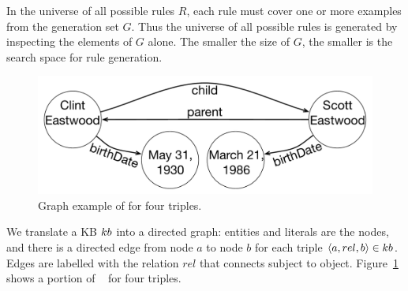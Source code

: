 In the universe of all possible rules $R$, 
each rule must cover one or more examples from the generation set $G$. 
Thus the universe of all possible rules is generated by inspecting the elements of $G$ alone. 
The smaller the size of $G$, the smaller is the search space for rule generation. 


\begin{figure}[t]
	\centering
	\includegraphics[width=0.8\columnwidth]{include/figure/graph_example.pdf}
	\vspace{-1ex}
	\caption{Graph example of \dbpedia for four triples.}
	\label{fig:krd_graph_example}
	\vspace{-3ex}
\end{figure}

We translate a KB ${\sc kb}$ into a directed graph: entities and literals are the nodes, and there is a directed edge from node $a$ to node $b$ for each triple $\langle a,rel,b\rangle \in {\sc kb}$. 
Edges are labelled with the relation $rel$ that connects subject to object. Figure~\ref{fig:krd_graph_example} shows a portion of \dbpedia~\cite{bizer2009dbpedia} for four triples.

